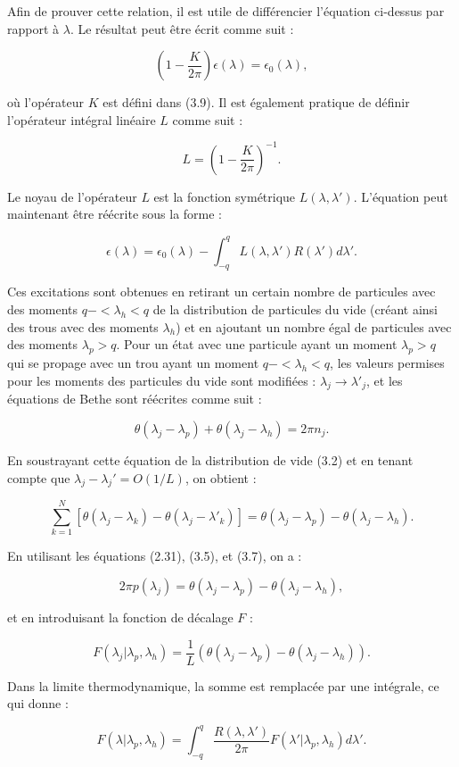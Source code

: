 Afin de prouver cette relation, il est utile de différencier l'équation ci-dessus par rapport à \( \lambda \). Le résultat peut être écrit comme suit :

\[
\left( 1 - \frac{K}{2\pi} \right) \epsilon(\lambda) = \epsilon_0(\lambda),
\]

où l'opérateur \( K \) est défini dans (3.9). Il est également pratique de définir l'opérateur intégral linéaire \( L \) comme suit :

\[
L = \left( 1 - \frac{K}{2\pi} \right)^{-1}.
\]

Le noyau de l'opérateur \( L \) est la fonction symétrique \( L(\lambda, \lambda') \). L'équation peut maintenant être réécrite sous la forme :

\[
\epsilon(\lambda) = \epsilon_0(\lambda) - \int_{-q}^{q} L(\lambda, \lambda') R(\lambda') d\lambda'.
\]

Ces excitations sont obtenues en retirant un certain nombre de particules avec des moments \( q- < \lambda_h < q \) de la distribution de particules du vide (créant ainsi des trous avec des moments \( \lambda_h \)) et en ajoutant un nombre égal de particules avec des moments \( \lambda_p > q \). Pour un état avec une particule ayant un moment \( \lambda_p > q \) qui se propage avec un trou ayant un moment \( q- < \lambda_h < q \), les valeurs permises pour les moments des particules du vide sont modifiées : \( \lambda_j \to \lambda'_j \), et les équations de Bethe sont réécrites comme suit :

\[
\theta(\lambda_j - \lambda_p) + \theta(\lambda_j - \lambda_h) = 2\pi n_j.
\]

En soustrayant cette équation de la distribution de vide (3.2) et en tenant compte que \( \lambda_j - \lambda_j' = O(1/L) \), on obtient :

\[
\sum_{k=1}^{N} \left[ \theta(\lambda_j - \lambda_k) - \theta(\lambda_j - \lambda'_k) \right] = \theta(\lambda_j - \lambda_p) - \theta(\lambda_j - \lambda_h).
\]

En utilisant les équations (2.31), (3.5), et (3.7), on a :

\[
2\pi p(\lambda_j) = \theta(\lambda_j - \lambda_p) - \theta(\lambda_j - \lambda_h),
\]

et en introduisant la fonction de décalage \( F \) :

\[
F(\lambda_j | \lambda_p, \lambda_h) = \frac{1}{L} \left( \theta(\lambda_j - \lambda_p) - \theta(\lambda_j - \lambda_h) \right).
\]

Dans la limite thermodynamique, la somme est remplacée par une intégrale, ce qui donne :

\[
F(\lambda | \lambda_p, \lambda_h) = \int_{-q}^{q} \frac{R(\lambda, \lambda')}{2\pi} F(\lambda' | \lambda_p, \lambda_h) d\lambda'.
\]
